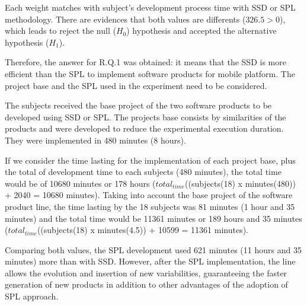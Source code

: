 \begin{itemize}





Each weight matches with subject's development process time with SSD or SPL methodology. There are evidences that both values are differents ($326.5>0$), which leads to reject the null ($H_0$) hypothesis and accepted the alternative hypothesis ($H_{1}$).

Therefore, the answer for R.Q.1 was obtained: it means that the SSD is more efficient than the SPL to implement software products for mobile platform. The project base and the SPL used in the experiment need to be considered.


The subjects received the base project of the two software products to be developed using SSD or SPL. The projects base consists by similarities of the products and were developed to reduce the experimental execution duration. They were implemented in 480 minutes (8 hours).

If we consider the time lasting for the implementation of each project base, plus the total of development time to each subjects (480 minutes), the total time would be of 10680 minutes or 178 hours ($total_{time}$((subje\allowbreak cts(18) x minutes(480)) + 2040 = 10680 minutes). Taking into account the base project of the software product line, the time lasting by the 18 subjects was 81 minutes (1 hour and 35 minutes) and the total time would be 11361 minutes or 189 hours and 35 minutes ($total_{time}$((subjects(18) x minutes(4.5)) + 10599 = 11361 minutes). 

Comparing both values, the SPL development used 621 minutes (11 hours and 35 minutes) more than with SSD. However, after the SPL implementation, the line allows the evolution and insertion of new variabilities, guaranteeing the faster generation of new products in addition to other advantages of the adoption of SPL approach.



\end{itemize}
